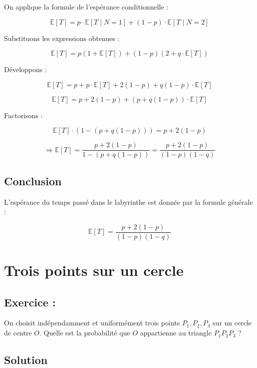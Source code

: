 On applique la formule de l'espérance conditionnelle :

\[
\mathbb{E}[T] = p \cdot \mathbb{E}[T \mid N = 1] + (1 - p) \cdot \mathbb{E}[T \mid N = 2]
\]

Substituons les expressions obtenues :

\[
\mathbb{E}[T] = p(1 + \mathbb{E}[T]) + (1 - p)(2 + q \cdot \mathbb{E}[T])
\]

Développons :

\[
\mathbb{E}[T] = p + p \cdot \mathbb{E}[T] + 2(1 - p) + q(1 - p) \cdot \mathbb{E}[T]
\]

\[
\mathbb{E}[T] = p + 2(1 - p) + \left(p + q(1 - p)\right) \cdot \mathbb{E}[T]
\]

Factorisons :

\[
\mathbb{E}[T] \cdot \left(1 - \left(p + q(1 - p)\right)\right) = p + 2(1 - p)
\]

\[
\Rightarrow \mathbb{E}[T] = \frac{p + 2(1 - p)}{1 - \left(p + q(1 - p)\right)}
= \frac{p + 2(1 - p)}{(1 - p)(1 - q)}
\]

\subsection*{Conclusion}

L'espérance du temps passé dans le labyrinthe est donnée par la formule générale :

\[
\boxed{
\mathbb{E}[T] = \frac{p + 2(1 - p)}{(1 - p)(1 - q)}
}
\]


\section{Trois points sur un cercle}

\subsection*{Exercice :}


\begin{exerciseBox}
On choisit indépendamment et uniformément trois points $P_1,P_2,P_3$ sur un cercle de centre $O$. Quelle est la probabilité que $O$ appartienne au triangle $P_1P_2P_3$ ? 
\end{exerciseBox}




\subsection*{Solution}

